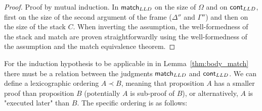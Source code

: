 \begin{proof}
   Proof by mutual induction. In $\mathsf{match}_{LLD} \;$on the size of $\Omega$ and on $\mathsf{cont}_{LLD}$, first on the size of the second argument of the frame ($\Delta''$ and $\Gamma''$) and then on the size of the stack $C$. When inverting the assumption, the well-formedness of the stack and match are proven straightforwardly using the well-formedness of the assumption and the match equivalence theorem.
\end{proof}

For the induction hypothesis to be applicable in in Lemma~\ref{thm:body_match} there must be
a relation between the judgments $\mathsf{match}_{LLD} \;$and $\mathsf{cont}_{LLD}$.
We can define a lexicographic ordering $A \prec B$, meaning that proposition $A$ has a smaller proof than proposition $B$ (potentially $A$ is sub-proof of $B$),
or alternatively, $A$ is "executed later" than $B$.
The specific ordering is as follows:

